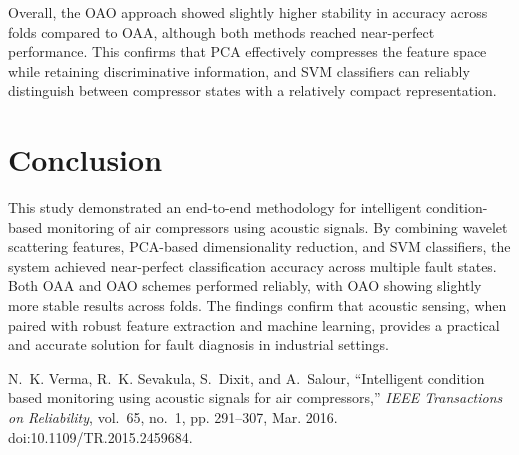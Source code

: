 \documentclass[12pt,a4paper]{article}
\begin{document}
\begin{multicols}{2}
Overall, the OAO approach showed slightly higher stability in accuracy across 
folds compared to OAA, although both methods reached near-perfect performance. 
This confirms that PCA effectively compresses the feature space while retaining 
discriminative information, and SVM classifiers can reliably distinguish 
between compressor states with a relatively compact representation.

\section{Conclusion}
\label{sec:conclusion}
This study demonstrated an end-to-end methodology for intelligent condition-based monitoring of air compressors using acoustic signals. By combining wavelet scattering features, PCA-based dimensionality reduction, and SVM classifiers, the system achieved near-perfect classification accuracy across multiple fault states. Both OAA and OAO schemes performed reliably, with OAO showing slightly more stable results across folds. The findings confirm that acoustic sensing, when paired with robust feature extraction and machine learning, provides a practical and accurate solution for fault diagnosis in industrial settings.

\begin{thebibliography}{1}
N.~K. Verma, R.~K. Sevakula, S.~Dixit, and A.~Salour, ``Intelligent condition based monitoring using acoustic signals for air compressors,'' \emph{IEEE Transactions on Reliability}, vol.~65, no.~1, pp. 291--307, Mar. 2016. doi:10.1109/TR.2015.2459684.
\end{thebibliography}
\end{multicols}
\end{document}
